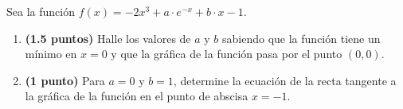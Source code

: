 
Sea la función $f(x)=-2x^3+a\cdot e^{-x}+b\cdot x-1$.
\begin{enumerate}[label=\alph*)]
\item \textbf{(1.5 puntos)} Halle los valores de $a$ y $b$ sabiendo que la función tiene un mínimo en $x=0$ y que la gráfica de la función pasa por el punto $(0,0)$.
\item \textbf{(1 punto)} Para $a=0$ y $b=1$, determine la ecuación de la recta tangente a la gráfica de la función en el punto de abscisa $x=-1$.
\end{enumerate}
